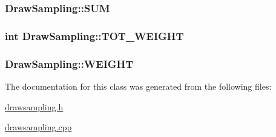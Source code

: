 \subsubsection[{\texorpdfstring{S\+UM}{SUM}}]{ Draw\+Sampling\+::\+S\+UM\hspace{0.3cm}{\ttfamily [protected]}}\hypertarget{classDrawSampling_a63072a47a8eb23f487f94418c9a27208}{}\label{classDrawSampling_a63072a47a8eb23f487f94418c9a27208}
\subsubsection[{\texorpdfstring{T\+O\+T\+\_\+\+W\+E\+I\+G\+HT}{TOT_WEIGHT}}]{\setlength{\rightskip}{0pt plus 5cm}int Draw\+Sampling\+::\+T\+O\+T\+\_\+\+W\+E\+I\+G\+HT\hspace{0.3cm}{\ttfamily [protected]}}\hypertarget{classDrawSampling_a8ce16ba19af34ba89f7722b7d993143c}{}\label{classDrawSampling_a8ce16ba19af34ba89f7722b7d993143c}
\subsubsection[{\texorpdfstring{W\+E\+I\+G\+HT}{WEIGHT}}]{ Draw\+Sampling\+::\+W\+E\+I\+G\+HT\hspace{0.3cm}{\ttfamily [protected]}}\hypertarget{classDrawSampling_ac76ed88fbade57d7d259fa6bb4ddb312}{}\label{classDrawSampling_ac76ed88fbade57d7d259fa6bb4ddb312}


The documentation for this class was generated from the following files\+:\begin{DoxyCompactItemize}
\item 
\hyperlink{drawsampling_8h}{drawsampling.\+h}\item 
\hyperlink{drawsampling_8cpp}{drawsampling.\+cpp}\end{DoxyCompactItemize}
